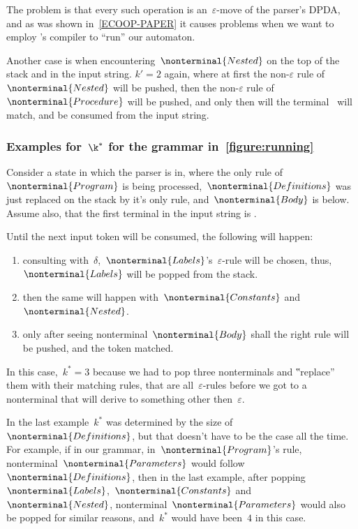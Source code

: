 The problem is that every such operation is 
  an~$ε$-move of the parser's DPDA, and as was shown in~\cref{ECOOP-PAPER}
  it causes problems when we want to employ \Java's compiler to ``run'' our
  automaton.

Another case is when encountering~$\nonterminal{Nested}$ on the top of the stack
  and  in the input string.
  $k'=2$ again, where at first the non-$ε$ rule of~$\nonterminal{Nested}$ will
  be pushed, then the non-$ε$ rule of~$\nonterminal{Procedure}$ will be
  pushed, and only then will the terminal~ will match,
  and be consumed from the input string.

\subsubsection{Examples for~$\k^*$ for the grammar in~\cref{figure:running}}
Consider a state in which the parser is in, where the
  only rule of~$\nonterminal{Program}$ is being processed,~$\nonterminal{Definitions}$
  was just replaced on the stack by it's only rule, and~$\nonterminal{Body}$ is below.
Assume also, that the first terminal in the input string is .

Until the next input token will be consumed, the following will happen:
  \begin{enumerate}
    \item consulting with~$δ$,~$\nonterminal{Labels}$'s~$ε$-rule will
      be chosen, thus,~$\nonterminal{Labels}$ will be popped from the stack.
    \item then the same will happen with~$\nonterminal{Constants}$ and~$\nonterminal{Nested}$.
    \item only after seeing nonterminal~$\nonterminal{Body}$ shall the right rule will be
      pushed, and the token matched.
  \end{enumerate}
In this case,~$k^*=3$ because we had to pop three nonterminals and ‟replace” them with
  their matching rules, that are all~$ε$-rules before we got to a nonterminal
  that will derive to something other then~$ε$.

In the last example~$k^*$ was determined by the size of~$\nonterminal{Definitions}$, but that
  doesn't have to be the case all the time.
For example, if in our grammar, in~$\nonterminal{Program}$'s rule,
  nonterminal~$\nonterminal{Parameters}$ would follow~$\nonterminal{Definitions}$,
  then in the last example, after popping~$\nonterminal{Labels}$,~$\nonterminal{Constants}$
  and~$\nonterminal{Nested}$, nonterminal~$\nonterminal{Parameters}$ would also be popped
  for similar reasons, and~$k^*$ would have been~$4$ in this case.


